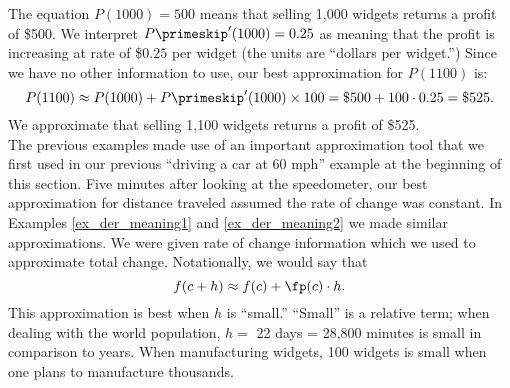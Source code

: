 {\enlargethispage{2\baselineskip}
The equation $P(1000)=500$ means that selling 1,000 widgets returns a profit of \$500. We interpret $P\primeskip'(1000) = 0.25$ as meaning that the profit is increasing at rate of \$$0.25$ per widget (the units are ``dollars per widget.'') Since we have no other information to use, our best approximation for $P(1100)$ is:
	$$P(1100) \approx P(1000) + P\primeskip'(1000)\times100 = \text{\$500} + 100\cdot0.25 = \text{\$525.}$$
We approximate that selling 1,100 widgets returns a profit of \$525.
}\\

The previous examples made use of an important approximation tool that we first used in our previous ``driving a car at 60 mph'' example at the beginning of this section. Five minutes after looking at the speedometer, our best approximation for distance traveled assumed the rate of change was constant. In Examples \ref{ex_der_meaning1} and \ref{ex_der_meaning2} we made similar approximations. We were given rate of change information which we used to approximate total change. Notationally, we would say that 
	$$f(c+h) \approx f(c) + \fp(c)\cdot h.$$ This approximation is best when $h$ is ``small.'' ``Small'' is a relative term; when dealing with the world population, $h=$ 22 days = 28,800 minutes is small in comparison to years. When manufacturing widgets, 100 widgets is small when one plans to manufacture thousands. \\


